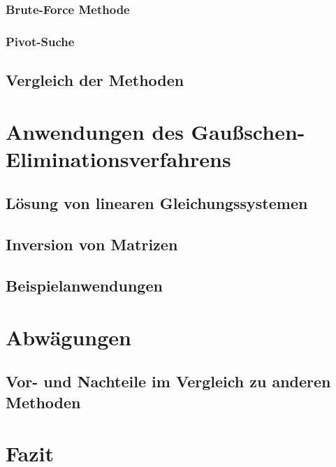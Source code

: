 \documentclass[a4paper, 12pt]{report}
\begin{document}
\begin{sloppypar}
\subsection{Brute-Force Methode}
\subsection{Pivot-Suche}
\section{Vergleich der Methoden}
\chapter{Anwendungen des Gaußschen-Eliminationsverfahrens}
\section{Lösung von linearen Gleichungssystemen}
\section{Inversion von Matrizen}
\section{Beispielanwendungen}
\chapter{Abwägungen}
\section{Vor- und Nachteile im Vergleich zu anderen Methoden}
\chapter{Fazit}
\end{sloppypar}
\end{document}
